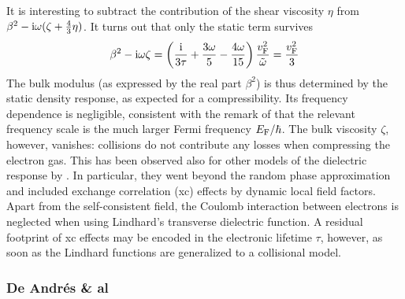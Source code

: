 \documentclass[11pt, oneside]{article}   	%
\begin{document}
It is interesting to subtract the contribution of the shear viscosity $\eta$ 
from $\beta^2 - {\rm i} \omega( \zeta + \tfrac43 \eta)$. 
It turns out that only the static term survives
\begin{equation}
\beta^2 - {\rm i} \omega \zeta = 
\left( \frac{ {\rm i} }{ 3 \tau } + \frac{3 \omega }{5} 
- \frac{4 \omega}{15}
\right) \frac{ v_{\rm F}^2 }{ \tilde\omega }
=
\frac{ v_{\rm F}^2 }{ 3 }
\label{eq:complex-bulk-modulus}
\end{equation}
The bulk modulus (as expressed by the real part $\beta^2$) is thus determined by the
static density response, as expected for a compressibility. Its frequency dependence
is negligible, consistent with the remark of \citet{Conti_1999} that the relevant
frequency scale is the much larger Fermi frequency $E_{\rm F}/\hbar$.
The bulk viscosity $\zeta$, however,
vanishes: collisions do not contribute any losses when compressing the electron gas.
This has been observed also for other models of the dielectric response by
\citet{Conti_1999}.
In particular, they went 
beyond the random phase approximation and included exchange correlation ({\sc xc}) effects 
by dynamic local field factors. Apart from the self-consistent field, the Coulomb interaction between electrons is neglected when using Lindhard's transverse dielectric function. A residual footprint of {\sc xc} effects may be encoded in the electronic lifetime $\tau$, however, as soon as the Lindhard functions are generalized to a collisional model.


\subsubsection{De Andrés \& al}
\label{a:deAndres-et-al}
\end{document}
